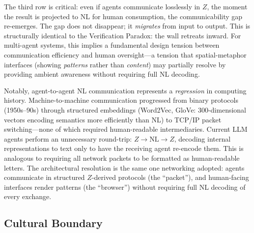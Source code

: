 \documentclass[11pt]{article}
\theoremstyle{definition}
\begin{document}
The third row is critical: even if agents communicate losslessly in $Z$, the moment the result is projected to NL for human consumption, the communicability gap re-emerges. The gap does not disappear; it \emph{migrates} from input to output. This is structurally identical to the Verification Paradox: the wall retreats inward. For multi-agent systems, this implies a fundamental design tension between communication efficiency and human oversight---a tension that spatial-metaphor interfaces (showing \emph{patterns} rather than \emph{content}) may partially resolve by providing ambient awareness without requiring full NL decoding.

Notably, agent-to-agent NL communication represents a \emph{regression} in computing history. Machine-to-machine communication progressed from binary protocols (1950s--90s) through structured embeddings (Word2Vec, GloVe: 300-dimensional vectors encoding semantics more efficiently than NL) to TCP/IP packet switching---none of which required human-readable intermediaries. Current LLM agents perform an unnecessary round-trip: $Z \to \text{NL} \to Z$, decoding internal representations to text only to have the receiving agent re-encode them. This is analogous to requiring all network packets to be formatted as human-readable letters. The architectural resolution is the same one networking adopted: agents communicate in structured $Z$-derived protocols (the ``packet''), and human-facing interfaces render patterns (the ``browser'') without requiring full NL decoding of every exchange.

\subsection{Cultural Boundary}
\end{document}
